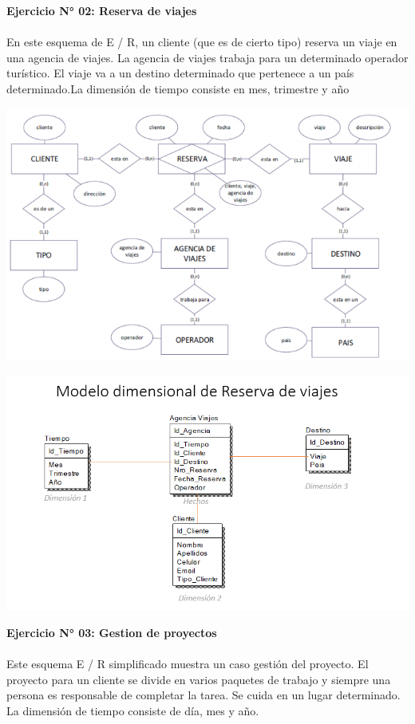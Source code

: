 \item{
\textbf{Ejercicio N° 02: Reserva de viajes}\\\\
En este esquema de E / R, un cliente (que es de cierto tipo) reserva un viaje en una agencia de viajes. La agencia de viajes trabaja para un determinado operador turístico. El viaje va a un destino determinado que pertenece a un país determinado.La dimensión de tiempo consiste en mes, trimestre y año

\begin{center}
\includegraphics[width=15cm]{./Imagenes/diagrama2}
\end{center}

\begin{center}
\includegraphics[width=15cm]{./Imagenes/dimension2}
\end{center}

\item{
\textbf{Ejercicio N° 03: Gestion de proyectos}\\\\
Este esquema E / R simplificado muestra un caso gestión del proyecto.
El proyecto para un cliente se divide en varios paquetes de trabajo y siempre una persona es responsable de completar la
tarea. Se cuida en un lugar determinado.
La dimensión de tiempo consiste de día, mes y año.

}}
